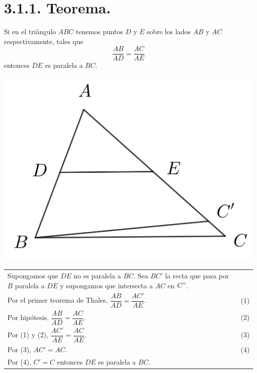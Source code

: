 \documentclass[12pt,a4paper, oneside]{book}
\begin{document}
\section{3.1.1. Teorema.}
 Si en el triángulo $ABC$ tenemos puntos $D$ y $E$ sobre los lados $AB$ y $AC$ respectivamente, tales que $$\dfrac{AB}{AD}=\dfrac{AC}{AE}$$
entonces $DE$ es paralela a $BC$.
\\ 
\begin{center}
\includegraphics[scale=0.6]{Imagenes/thales1.1.png} 
\end{center}
\begin{tabular}{p{15.9 cm}p{1 cm}}
Supongamos que $DE$ no es paralela a $BC$. Sea $BC'$ la recta que pasa por $B$ paralela a $DE$ y supongamos que intersecta a $AC$ en $C"$.
\\Por el primer teorema de Thales, $\dfrac{AB}{AD}=\dfrac{AC'}{AE}$. & (1)
\\Por hipótesis, $\dfrac{AB}{AD}=\dfrac{AC}{AE}$. & (2) 
\\Por (1) y (2), $\dfrac{AC'}{AE}=\dfrac{AC}{AE}$. &(3)
\\Por (3), $AC'=AC$. & (4) 
\\Por (4), $C'=C$ entonces $DE$ es paralela a $BC$.
\end{tabular}
\end{document}
